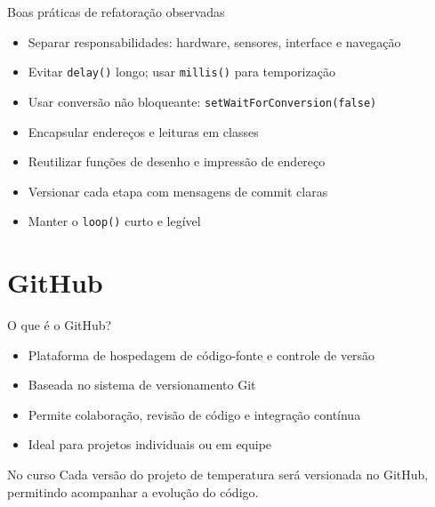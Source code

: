 \documentclass[aspectratio=169]{beamer}
\begin{document}
\begin{frame}{Boas práticas de refatoração observadas}
    \begin{itemize}
        \item Separar responsabilidades: hardware, sensores, interface e navegação
        \item Evitar \texttt{delay()} longo; usar \texttt{millis()} para temporização
        \item Usar conversão não bloqueante: \texttt{setWaitForConversion(false)}
        \item Encapsular endereços e leituras em classes
        \item Reutilizar funções de desenho e impressão de endereço
        \item Versionar cada etapa com mensagens de commit claras
        \item Manter o \texttt{loop()} curto e legível
    \end{itemize}
\end{frame}

\section{GitHub}

\begin{frame}{O que é o GitHub?}
    \begin{itemize}
        \item Plataforma de hospedagem de código-fonte e controle de versão
        \item Baseada no sistema de versionamento Git
        \item Permite colaboração, revisão de código e integração contínua
        \item Ideal para projetos individuais ou em equipe
    \end{itemize}
    \vfill
    \begin{block}{No curso}
        Cada versão do projeto de temperatura será versionada no GitHub, permitindo acompanhar a evolução do código.
    \end{block}
    
\end{frame}
\end{document}
